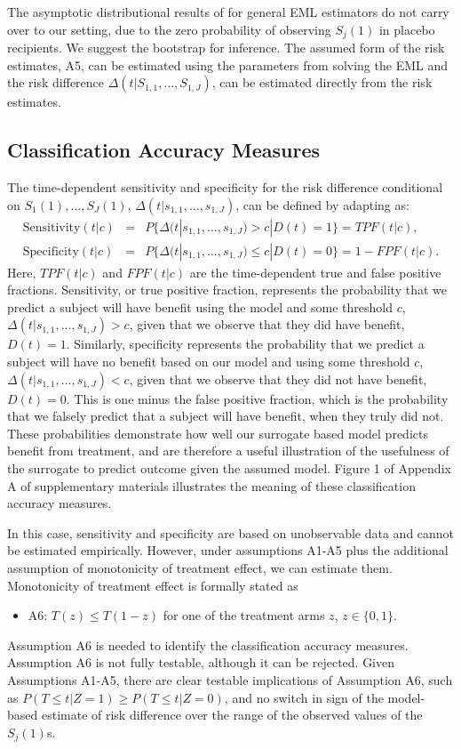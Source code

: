 \documentclass[times, doublespace]{simauth}
\begin{document}
The asymptotic distributional results of \citet{Pepe91} for general EML estimators do not carry over to our setting, due to the zero probability of observing $S_{j}(1)$ in placebo recipients. We suggest the bootstrap for inference. The assumed form of the risk estimates, A5, can be estimated using the parameters from solving the EML and the risk difference $\Delta(t|S_{1,1}, \dots, S_{1,J})$, can be estimated directly from the risk estimates. 

\subsection{Classification Accuracy Measures} \label{CAM}
The time-dependent sensitivity and specificity for the risk difference conditional on $S_{1}(1), \dots, S_{J}(1)$, $\Delta(t|s_{1,1}, \dots, s_{1,J})$, can be defined by adapting \citet{Heagerty00} as:
\begin{eqnarray*}
\mbox{Sensitivity}(t|c)&=&P\{\Delta(t|s_{1,1}, \dots, s_{1,J}) > c|D(t)=1\}=TPF(t|c),\\
\mbox{Specificity}(t|c)&=&P\{\Delta(t|s_{1,1}, \dots, s_{1,J}) \leq c|D(t)=0\}=1-FPF(t|c).
\end{eqnarray*}
Here, $TPF(t|c)$ and $FPF(t|c)$ are the time-dependent true and false positive fractions. Sensitivity, or true positive fraction, represents the probability that we predict a subject will have benefit using the model and some threshold $c$, $\Delta(t|s_{1,1}, \dots, s_{1,J}) > c$, given that we observe that they did have benefit, $D(t)=1$. Similarly, specificity represents the probability that we predict a subject will have no benefit based on our model and using some threshold $c$, $\Delta(t|s_{1,1}, \dots, s_{1,J}) < c$, given that we observe that they did not have benefit, $D(t)=0$. This is one minus the false positive fraction, which is the probability that we falsely predict that a subject will have benefit, when they truly did not. These probabilities demonstrate how well our surrogate based model predicts benefit from treatment, and are therefore a useful illustration of the usefulness of the surrogate to predict outcome given the assumed model. Figure 1 of Appendix A of supplementary materials illustrates the meaning of these classification accuracy measures. 

In this case, sensitivity and specificity are based on unobservable data and cannot be estimated empirically. However, under assumptions A1-A5 plus the additional assumption of monotonicity of treatment effect, we can estimate them. Monotonicity of treatment effect is formally stated as
\begin{itemize}
\item A6: $T(z) \leq T(1-z)$ for one of the treatment arms $z$, $z\in \{0,1\}$.
\end{itemize}
Assumption A6 is needed to identify the classification accuracy measures. Assumption A6 is not fully testable, although it can be rejected. Given Assumptions A1-A5, there are clear testable implications of Assumption A6, such as $P(T\leq t|Z=1)\geq P(T\leq t|Z=0)$, and no switch in sign of the model-based estimate of risk difference over the range of the observed values of the $S_j(1)$s. 
\end{document}
